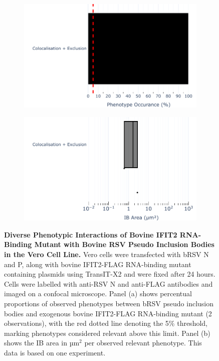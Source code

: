 \begin{figure}
    \begin{subfigure}{0.495\textwidth}
        \caption{}
        \includegraphics[width=1\linewidth]{09. Chapter 4/Figs/01. pIB/03. IFIT2/05. IFIT2-RNA binding mutant/02. pIB/04. bar_bi2f24_bnbp.pdf} 
    \end{subfigure}
    \begin{subfigure}{0.495\textwidth}
        \caption{}
        \includegraphics[width=1\linewidth]{09. Chapter 4/Figs/01. pIB/03. IFIT2/05. IFIT2-RNA binding mutant/02. pIB/05. box_bi2f24_bnbp.pdf}
    \end{subfigure}
    \caption[Diverse Phenotypic Interactions of Bovine IFIT2 RNA-Binding Mutant with Bovine RSV Pseudo Inclusion Bodies in the Vero Cell Line.]{\textbf{Diverse Phenotypic Interactions of Bovine IFIT2 RNA-Binding Mutant with Bovine RSV Pseudo Inclusion Bodies in the Vero Cell Line.} Vero cells were transfected with bRSV N and P, along with bovine IFIT2-FLAG RNA-binding mutant containing plasmids using TransIT-X2 and were fixed after 24 hours. Cells were labelled with anti-RSV N and anti-FLAG antibodies and imaged on a confocal microscope. Panel (a) shows percentual proportions of observed phenotypes between bRSV pseudo inclusion bodies and exogenous bovine IFIT2-FLAG RNA-binding mutant (2 observations), with the red dotted line denoting the 5\% threshold, marking phenotypes considered relevant above this limit. Panel (b) shows the IB area in \(\mbox{µm}^2\) per observed relevant phenotype. This data is based on one experiment.}
    \label{fig:Diverse Phenotypic Interactions of Bovine IFIT2 RNA-Binding Mutant with Bovine RSV Pseudo Inclusion Bodies in the Vero Cell Line}
\end{figure}

